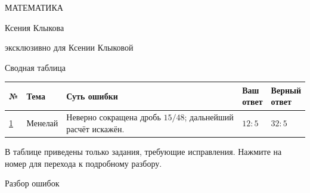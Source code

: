 \documentclass[a4paper,12pt]{article}
\begin{document}
\hypersetup{pageanchor=false}
\begin{titlepage}
\centering\vspace*{30mm}
{\large\color{darkaccent} МАТЕМАТИКА\par}
\vspace{17mm}{\LARGE Ревью домашней работы\par}
\vspace{18mm}{\normalsize Геометрия. Анализ рукописных решений\par}
\vfill
{\large Ксения Клыкова\par}
\vspace{12mm}{\normalsize 21 ноября 2026 г.\par}
\vspace{22mm}{\small Лёвин Артём Александрович\par}
{\small эксклюзивно для Ксении Клыковой\par}
\vspace{16mm}
\end{titlepage}
\hypersetup{pageanchor=true}
\setcounter{page}{1}
\newpage
\begin{center}{\Large\color{darkaccent} Сводная таблица}\end{center}
\vspace{12mm}
\begingroup\small\setlength{\tabcolsep}{3pt}
\begin{tabularx}{\linewidth}{@{}p{10mm}p{27mm}>{\raggedright\arraybackslash}X p{19mm}p{22mm}@{}}
\toprule
\textbf{№}&\textbf{Тема}&\textbf{Суть ошибки}&\shortstack[l]{\textbf{Ваш}\\\textbf{ответ}}&\shortstack[l]{\textbf{Верный}\\\textbf{ответ}}\\
\midrule
\hyperref[task:1]{1}&Менелай&Неверно сокращена дробь $15/48$; дальнейший расчёт искажён.&$12:5$&$32:5$\\
\bottomrule
\end{tabularx}
\endgroup
\par\vspace{9mm}
В таблице приведены только задания, требующие исправления.
Нажмите на номер для перехода к подробному разбору.
\clearpage
\thispagestyle{empty}
\vspace*{.35\textheight}
\begin{center}{\Huge\color{darkaccent} Разбор ошибок}\end{center}
\clearpage
{}\label{task:1}
\end{document}

